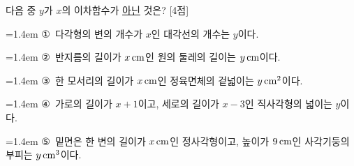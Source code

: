 다음 중 $y$가 $x$의 이차함수가 \underline{아닌} 것은? \mbox{[4점]}
\par\medskip\par\noindent\hangindent=1.4em {\small ①}\ 다각형의 변의 개수가 $x$인 대각선의 개수는 $y$이다.\par\noindent\hangindent=1.4em {\small ②}\ 반지름의 길이가 $x\mkern3mu \mathrm{cm}$인 원의 둘레의 길이는 $y\mkern3mu \mathrm{cm}$이다.\par\noindent\hangindent=1.4em {\small ③}\ 한 모서리의 길이가 $x\mkern3mu \mathrm{cm}$인 정육면체의 겉넓이는 $y\mkern3mu \mathrm{cm}^2$이다.\par\noindent\hangindent=1.4em {\small ④}\ 가로의 길이가 $x+1$이고, 세로의 길이가 $x-3$인 직사각형의 넓이는 $y$이다.\par\noindent\hangindent=1.4em {\small ⑤}\ 밑면은 한 변의 길이가 $x\mkern3mu \mathrm{cm}$인 정사각형이고, 높이가 $9\mkern3mu \mathrm{cm}$인 사각기둥의 부피는 $y\mkern3mu \mathrm{cm}^3$이다.\par\medskip
